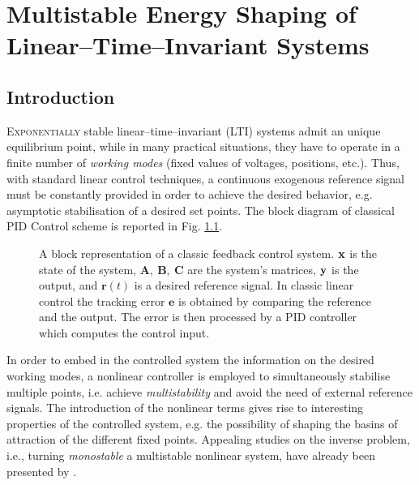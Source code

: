 %
\chapter{Multistable Energy Shaping of Linear--Time--Invariant Systems}

\label{chap:multistable}
\minitoc

\thispagestyle{empty}

\newpage
\section{Introduction}
\lettrine[lines=4]{\color{brickred}E}{xponentially} stable linear--time--invariant (LTI) systems admit an unique equilibrium point, while in many practical situations, they have to operate in a finite number of \textit{working modes} (fixed values of voltages, positions, etc.).
Thus, with standard linear control techniques, a continuous exogenous reference signal must be constantly provided in order to achieve the desired behavior, e.g. asymptotic stabilisation of a desired set points. The block diagram of classical PID Control scheme is reported in Fig. \ref{fig:PID}.
%
\begin{figure}[!h]
	\centering
	
	\caption[A block representation of a classic feedback control system]{A block representation of a classic feedback control system. $\mathbf{x}$ is the state of the system, $\mathbf{A},~\mathbf{B},~\mathbf{C}$ are the system's matrices, $\mathbf{y}$ is the output, and $\mathbf{r}(t)$ is a desired reference signal. In classic linear control the tracking error $\mathbf{e}$ is obtained by comparing the reference and the output. The error is then processed by a PID controller which computes the control input.}
	\label{fig:PID}
\end{figure}
%
In order to embed in the controlled system the information on the desired working modes, a nonlinear controller is employed to simultaneously stabilise multiple points, i.e. achieve \textit{multistability} and avoid the need of external reference signals.
The introduction of the nonlinear terms gives rise to interesting properties of the controlled system, e.g. the possibility of shaping the basins of attraction of the different fixed points.
Appealing studies on the inverse problem, i.e., turning \textit{monostable} a {multistable} nonlinear system, have already been presented by \cite{PISARCHIK2014167}.
\newline

